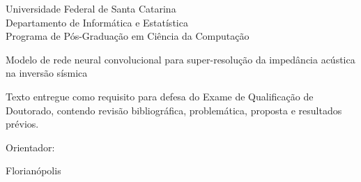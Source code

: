 \thispagestyle{empty}
\begin{center}
\large Universidade Federal de Santa Catarina\\
Departamento de Informática e Estatística\\
Programa de Pós-Graduação em Ciência da Computação
\end{center}

\vspace*{1.5cm}
\begin{center}
\large \aluno
\end{center}


\vspace*{2.3cm}

\begin{center}
{\sc  \tituloTese Modelo de rede neural convolucional para super-resolução da impedância acústica na inversão sísmica}
\end{center}

\vspace*{5.5cm}

\begin{flushright}
\begin{minipage}{9.0cm}
\linespread{1}
Texto entregue como requisito para defesa do Exame de Qualificação de
Doutorado, contendo revisão bibliográfica, problemática, proposta e resultados
prévios.



\vspace*{0.5cm}
Orientador: \nomeProf\\

\end{minipage}
\end{flushright}

\null \vfill


\begin{center}
Florianópolis \\ \the\year
\end{center}

